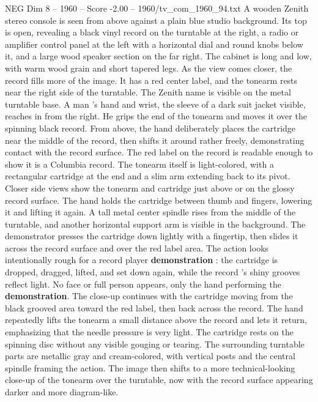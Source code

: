 \begin{textsample}{NEG Dim 8 – 1960 – Score -2.00 – 1960/tv\_com\_1960\_94.txt}  \label{ex:f8_neg_012}
A wooden Zenith stereo console is seen from above against a plain blue studio background.
Its top is open, revealing a black vinyl record on the turntable at the right, a radio or amplifier control panel at the left with a horizontal dial and round knobs below it, and a large wood speaker section on the far right.
The cabinet is long and low, with warm wood grain and short tapered legs.
As the view comes closer, the record fills more of the image.
It has a red center label, and the tonearm rests near the right side of the turntable.
The Zenith name is visible on the metal turntable base.
A man ’s hand and wrist, the sleeve of a dark suit jacket visible, reaches in from the right.
He grips the end of the tonearm and moves it over the spinning black record.
From above, the hand deliberately places the cartridge near the middle of the record, then shifts it around rather freely, demonstrating contact with the record surface.
The red label on the record is readable enough to show it is a Columbia record.
The tonearm itself is light-colored, with a rectangular cartridge at the end and a slim arm extending back to its pivot.
Closer side views show the tonearm and cartridge just above or on the glossy record surface.
The hand holds the cartridge between thumb and fingers, lowering it and lifting it again.
A tall metal center spindle rises from the middle of the turntable, and another horizontal support arm is visible in the background.
The demonstrator presses the cartridge down lightly with a fingertip, then slides it across the record surface and over the red label area.
The action looks intentionally rough for a record player \textbf{demonstration} : the cartridge is dropped, dragged, lifted, and set down again, while the record ’s shiny grooves reflect light.
No face or full person appears, only the hand performing the \textbf{demonstration}.
The close-up continues with the cartridge moving from the black grooved area toward the red label, then back across the record.
The hand repeatedly lifts the tonearm a small distance above the record and lets it return, emphasizing that the needle pressure is very light.
The cartridge rests on the spinning disc without any visible gouging or tearing.
The surrounding turntable parts are metallic gray and cream-colored, with vertical posts and the central spindle framing the action.
The image then shifts to a more technical-looking close-up of the tonearm over the turntable, now with the record surface appearing darker and more diagram-like.

\end{textsample}
